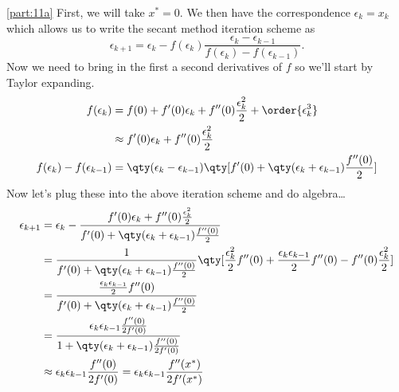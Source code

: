 \documentclass[boxes,pages]{homework}
\begin{document}
\begin{solution}
	\ref{part:11a}
	First, we will take $x^* = 0$. We then have the correspondence $\epsilon_k = x_k$ which allows us to write the secant method iteration scheme as
	\begin{equation*}
		\epsilon_{k+1} = \epsilon_k - f(\epsilon_k)\frac{\epsilon_k - \epsilon_{k-1}}{f(\epsilon_k) - f(\epsilon_{k-1})}.
	\end{equation*}
	Now we need to bring in the first a second derivatives of $f$ so we'll start by Taylor expanding.
	\begin{align*}
		f(\epsilon_k)                     & = f(0) + f'(0)\epsilon_k + f''(0)\frac{\epsilon_k^2}{2} + \order{\epsilon_k^3}                     \\
		                                  & \approx f'(0)\epsilon_k + f''(0)\frac{\epsilon_k^2}{2}                                             \\
		f(\epsilon_k) - f(\epsilon_{k-1}) & = \qty(\epsilon_k - \epsilon_{k-1})\qty[f'(0) + \qty(\epsilon_k + \epsilon_{k-1})\frac{f''(0)}{2}]
	\end{align*}
	Now let's plug these into the above iteration scheme and do algebra\ldots
	\begin{align*}
		\epsilon_{k+1} & = \epsilon_k - \frac{f'(0)\epsilon_k + f''(0)\frac{\epsilon_k^2}{2}}{f'(0) + \qty(\epsilon_k + \epsilon_{k-1})\frac{f''(0)}{2}}                                                   \\
		               & = \frac{1}{f'(0) + \qty(\epsilon_k + \epsilon_{k-1})\frac{f''(0)}{2}}\qty[\frac{\epsilon_k^2}{2}f''(0) + \frac{\epsilon_k\epsilon_{k-1}}{2}f''(0) - f''(0)\frac{\epsilon_k^2}{2}] \\
		               & = \frac{\frac{\epsilon_k\epsilon_{k-1}}{2}f''(0)}{f'(0) + \qty(\epsilon_k + \epsilon_{k-1})\frac{f''(0)}{2}}                                                                      \\
		               & = \frac{\epsilon_k\epsilon_{k-1}\frac{f''(0)}{2f'(0)}}{1 + \qty(\epsilon_k + \epsilon_{k-1})\frac{f''(0)}{2f'(0)}}                                                                \\
		               & \approx \epsilon_k\epsilon_{k-1}\frac{f''(0)}{2f'(0)} = \epsilon_k\epsilon_{k-1}\frac{f''(x^*)}{2f'(x^*)}
	\end{align*}


\end{solution}
\end{document}
